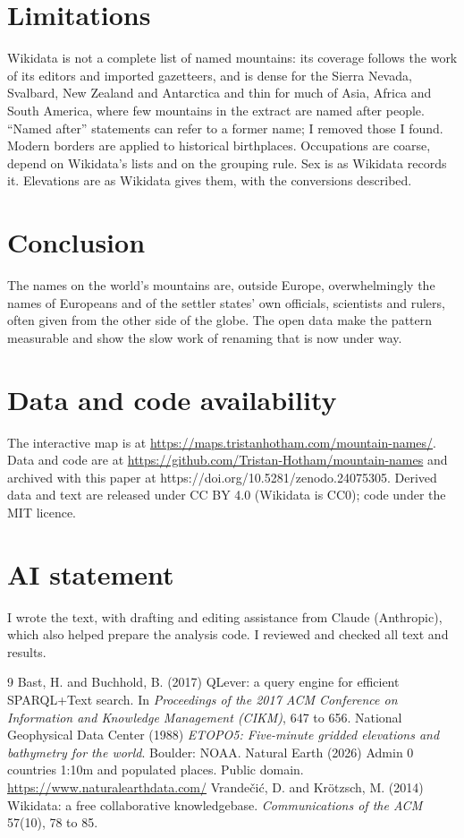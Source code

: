 \documentclass[11pt,a4paper]{article}
\begin{document}
\section{Limitations}
Wikidata is not a complete list of named mountains: its coverage follows the work of its editors and imported gazetteers, and is dense for the Sierra Nevada, Svalbard, New Zealand and Antarctica and thin for much of Asia, Africa and South America, where few mountains in the extract are named after people. ``Named after'' statements can refer to a former name; I removed those I found. Modern borders are applied to historical birthplaces. Occupations are coarse, depend on Wikidata's lists and on the grouping rule. Sex is as Wikidata records it. Elevations are as Wikidata gives them, with the conversions described.

\section{Conclusion}
The names on the world's mountains are, outside Europe, overwhelmingly the names of Europeans and of the settler states' own officials, scientists and rulers, often given from the other side of the globe. The open data make the pattern measurable and show the slow work of renaming that is now under way.

\section*{Data and code availability}
The interactive map is at \url{https://maps.tristanhotham.com/mountain-names/}. Data and code are at \url{https://github.com/Tristan-Hotham/mountain-names} and archived with this paper at https://doi.org/10.5281/zenodo.24075305. Derived data and text are released under CC BY 4.0 (Wikidata is CC0); code under the MIT licence.

\section*{AI statement}
I wrote the text, with drafting and editing assistance from Claude (Anthropic), which also helped prepare the analysis code. I reviewed and checked all text and results.

\begin{thebibliography}{9}
 Bast, H. and Buchhold, B. (2017) QLever: a query engine for efficient SPARQL+Text search. In \textit{Proceedings of the 2017 ACM Conference on Information and Knowledge Management (CIKM)}, 647 to 656.
 National Geophysical Data Center (1988) \textit{ETOPO5: Five-minute gridded elevations and bathymetry for the world}. Boulder: NOAA.
 Natural Earth (2026) Admin 0 countries 1:10m and populated places. Public domain. \url{https://www.naturalearthdata.com/}
 Vrande\v{c}i\'c, D. and Kr\"otzsch, M. (2014) Wikidata: a free collaborative knowledgebase. \textit{Communications of the ACM} 57(10), 78 to 85.
\end{thebibliography}
\end{document}
